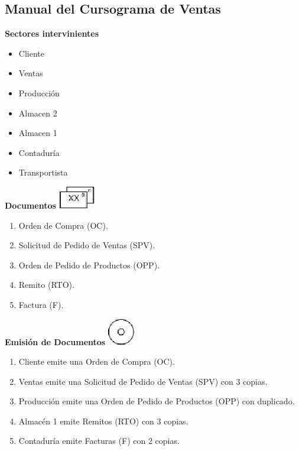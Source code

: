 \pagebreak
\subsection{Manual del Cursograma de Ventas}
\begin{center}\textbf{Sectores intervinientes}\end{center}
\begin{itemize}
  \item Cliente
  \item Ventas
  \item Producci\'on
  \item Almacen 2
  \item Almacen 1
  \item Contadur\'ia
  \item Transportista
\end{itemize}

\begin{center}
  \textbf{Documentos}
  \includegraphics{./Images/Simbolos/simbolo-Documentos.png}
\end{center}
\begin{enumerate}
  \item Orden de Compra (OC).
  \item Solicitud de Pedido de Ventas (SPV).
  \item Orden de Pedido de Productos (OPP).
  \item Remito (RTO).
  \item Factura (F).
\end{enumerate}

\begin{center}
  \textbf{Emisi\'on de Documentos}
  \includegraphics{./Images/Simbolos/simbolo-Emision-de-Documentos.png}
\end{center}
\begin{enumerate}
  \item Cliente emite una Orden de Compra (OC).
  \item Ventas emite una Solicitud de Pedido de Ventas (SPV) con 3 copias. 
  \item Producci\'on emite una Orden de Pedido de Productos (OPP) con duplicado.
  \item Almac\'en 1 emite Remitos (RTO) con 3 copias.
  \item Contadur\'ia emite Facturas (F) con 2 copias.
\end{enumerate}

